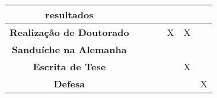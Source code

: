 \begin{table}[htb!]
\begin{tabular}{|l|l|l|l|l|l|l|}
\multicolumn{1}{|c|}{\textbf{resultados}} & \multicolumn{1}{c|}{} & \multicolumn{1}{c|}{} & \multicolumn{1}{c|}{} & \multicolumn{1}{c|}{} & \multicolumn{1}{c|}{} & \multicolumn{1}{c|}{} \\ 
\hline
\multicolumn{1}{|c|}{\textbf{Realização de Doutorado}} & \multicolumn{1}{c|}{} & \multicolumn{1}{c|}{} & \multicolumn{1}{c|}{} & \multicolumn{1}{c|}{X} & \multicolumn{1}{c|}{X} & \multicolumn{1}{c|}{} \\ 
\multicolumn{1}{|c|}{\textbf{Sanduíche na Alemanha}} & \multicolumn{1}{c|}{} & \multicolumn{1}{c|}{} & \multicolumn{1}{c|}{} & \multicolumn{1}{c|}{} & \multicolumn{1}{c|}{} & \multicolumn{1}{c|}{} \\ 
\hline
\multicolumn{1}{|c|}{\textbf{Escrita de Tese}} & \multicolumn{1}{c|}{} & \multicolumn{1}{c|}{} & \multicolumn{1}{c|}{} & \multicolumn{1}{c|}{} & \multicolumn{1}{c|}{X} & \multicolumn{1}{c|}{} \\ 
\hline
\multicolumn{1}{|c|}{\textbf{Defesa}} & \multicolumn{1}{c|}{} & \multicolumn{1}{c|}{} & \multicolumn{1}{c|}{} & \multicolumn{1}{c|}{} & \multicolumn{1}{c|}{} & \multicolumn{1}{c|}{X} \\ 
\hline
\end{tabular}
\end{table}